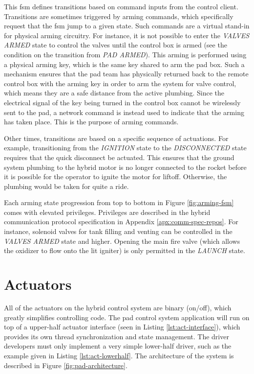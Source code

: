 This \gls{fsm} defines transitions based on command inputs from the control client. Transitions are sometimes triggered
by arming commands, which specifically request that the \gls{fsm} jump to a given state. Such commands are a virtual
stand-in for physical arming circuitry. For instance, it is not possible to enter the \textit{VALVES ARMED} state to
control the valves until the control box is armed (see the condition on the transition from \textit{PAD ARMED}). This
arming is performed using a physical arming key, which is the same key shared to arm the pad box. Such a mechanism
ensures that the pad team has physically returned back to the remote control box with the arming key in order to arm
the system for valve control, which means they are a safe distance from the active plumbing. Since the electrical
signal of the key being turned in the control box cannot be wirelessly sent to the pad, a network command is instead
used to indicate that the arming has taken place. This is the purpose of arming commands.

Other times, transitions are based on a specific sequence of actuations. For example, transitioning from the
\textit{IGNITION} state to the \textit{DISCONNECTED} state requires that the quick disconnect be actuated. This ensures
that the ground system plumbing to the hybrid motor is no longer connected to the rocket before it is possible for the
operator to ignite the motor for liftoff. Otherwise, the plumbing would be taken for quite a ride.

Each arming state progression from top to bottom in Figure \ref{fig:arming-fsm} comes with elevated privileges.
Privileges are described in the hybrid communication protocol specification in Appendix \ref{apx:comm-spec-repos}. For
instance, solenoid valves for tank filling and venting can be controlled in the \textit{VALVES ARMED} state and higher.
\cite{hybrid-comms} Opening the main fire valve (which allows the oxidizer to flow onto the lit igniter) is only
permitted in the \textit{LAUNCH} state.

\section{Actuators}

All of the actuators on the hybrid control system are binary (on/off), which greatly simplifies controlling code. The
pad control system application will run on top of a upper-half actuator interface (seen in Listing
\ref{lst:act-interface}), which provides its own thread synchronization and state management. The driver developers must
only implement a very simple lower-half driver, such as the example given in Listing \ref{lst:act-lowerhalf}. The
architecture of the system is described in Figure \ref{fig:pad-architecture}.

